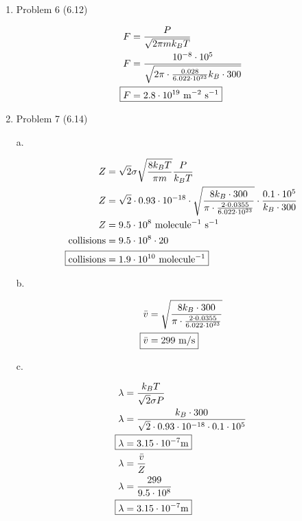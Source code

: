 \documentclass[12pt]{article}
\begin{document}
\begin{enumerate}
    \newpage
    \item Problem 6 (6.12)
    
    \begin{align*}
        F &= \frac{P}{\sqrt{2\pi m k_BT}} \\
        F &= \frac{10^{-8}\cdot10^5}{\sqrt{2\pi \cdot \frac{0.028}{6.022\cdot10^{23}} k_B\cdot300}} \\
        \Aboxed{F &= 2.8\cdot10^{19} \text{ m$^{-2}$ s$^{-1}$}}
    \end{align*}
    
    \newpage
    \item Problem 7 (6.14)
    
    a.

    \begin{align*}
        Z &= \sqrt{2} \sigma \sqrt{\frac{8k_BT}{\pi m}} \frac{P}{k_BT} \\
        Z &= \sqrt{2}\cdot0.93\cdot10^{-18}\cdot\sqrt{\frac{8k_B\cdot 300}{\pi\cdot\frac{2\cdot0.0355}{6.022\cdot10^{23}}}}\cdot\frac{0.1\cdot10^5}{k_B\cdot300} \\
        Z &= 9.5\cdot10^8 \text{ molecule$^{-1}$ s$^{-1}$}\\
        \text{collisions} &= 9.5\cdot10^8 \cdot 20 \\
        \Aboxed{\text{collisions} &= 1.9\cdot10^{10} \text{ molecule$^{-1}$}}
    \end{align*}

    b.

    \begin{align*}
        \bar{v} &= \sqrt{\frac{8k_B\cdot300}{\pi \cdot\frac{2\cdot0.0355}{6.022\cdot10^{23}}}} \\
        \Aboxed{\bar{v} &= 299 \text{ m/s}}
    \end{align*}

    c.

    \begin{align*}
        \lambda &= \frac{k_BT}{\sqrt{2} \sigma P} \\
        \lambda &= \frac{k_B\cdot300}{\sqrt{2}\cdot0.93\cdot10^{-18}\cdot0.1\cdot10^5} \\
        \Aboxed{\lambda &= 3.15\cdot10^{-7} \text{m}} \\
        \lambda &= \frac{\bar{v}}{Z} \\
        \lambda &= \frac{299}{9.5\cdot10^8} \\
        \Aboxed{\lambda &= 3.15\cdot10^{-7} \text{m}}
    \end{align*}
    

\end{enumerate}
\end{document}
